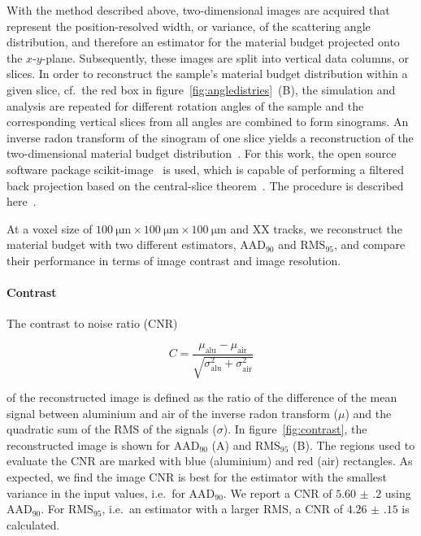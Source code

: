 \documentclass{PoS}
\newcommand{\rmsninetyfive}{\ensuremath{\textrm{RMS}_\textrm{95}}}
\newcommand{\aadninety}{\ensuremath{\textrm{AAD}_\textrm{90}}}
\begin{document}
With the method described above, two-dimensional images are acquired that represent the position-resolved width, or variance, of the scattering angle distribution,
 and therefore an estimator for the material budget projected onto the $x$-$y$-plane. 
Subsequently, these images are split into vertical data columns, or slices. 
In order to reconstruct the sample's material budget distribution within a given slice, cf.\ the red box in figure~\ref{fig:angledistries}~(B),
 the simulation and analysis are repeated for different rotation angles of the sample and the corresponding vertical slices from all angles are combined to form sinograms.
An inverse radon transform of the sinogram of one slice yields a reconstruction of the two-dimensional material budget distribution~\cite{ref:deans2007radon}.
For this work, the open source software package scikit-image~\cite{ref:scikitWebpage,ref:scikitArticle} is used,
 which is capable of performing a filtered back projection based on the central-slice theorem~\cite{ref:deans2007radon}.
The procedure is described here~\cite{JansenAPLarxiv}. 

At a voxel size of $\SI{100}{\um} \times \SI{100}{\um} \times \SI{100}{\um}$ and XX tracks, we reconstruct the material budget with two different estimators, $\aadninety$ and $\rmsninetyfive$,
 and compare their performance in terms of image contrast and image resolution. 


\paragraph{Contrast}

The contrast to noise ratio (CNR) 

\begin{equation}
 C = \frac{\mu_{\textrm{alu}} - \mu_{\textrm{air}}}{\sqrt{\sigma_{\textrm{alu}}^{2} + \sigma_{\textrm{air}}^{2}}}
\end{equation}

\noindent
of the reconstructed image is defined as the ratio of the difference of the mean signal between aluminium and air of the inverse radon transform ($\mu$)
 and the quadratic sum of the RMS of the signals ($\sigma$). 
In figure~\ref{fig:contrast}, the reconstructed image is shown for $\aadninety$ (A) and $\rmsninetyfive$ (B).
The regions used to evaluate the CNR are marked with blue (aluminium) and red (air) rectangles.
As expected, we find the image CNR is best for the estimator with the smallest variance in the input values, i.e.\ for $\aadninety$. 
We report a CNR of $\num{5.60(20)}$ using $\aadninety$. 
For $\rmsninetyfive$, i.e.\ an estimator with a larger RMS, a CNR of $\num{4.26(15)}$ is calculated. 
\end{document}
